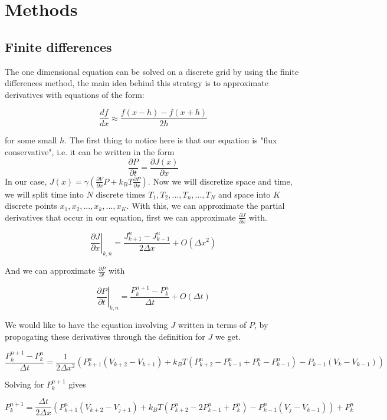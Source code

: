 \documentclass[
10pt, %
a4paper, %
oneside, %
headinclude,footinclude, %
BCOR5mm, %
]{scrartcl}
\begin{document}
\section{Methods}

\subsection{Finite differences}
The one dimensional equation can be solved on a discrete grid by using the finite differences method, the main idea behind this strategy is to approximate derivatives with equations of the form:

\begin{equation}
\frac{d f}{d x} \approx \frac{f(x - h) - f(x + h)}{2h}
\end{equation}

for some small $h$. The first thing to notice here is that our equation is "flux conservative", i.e. it can be written in the form 
$$ \frac{\partial P}{\partial t} = \frac{\partial J(x)}{\partial x} $$
In our case, $J(x) = \gamma \left ( \frac{\partial V}{\partial x} P + k_B T \frac{\partial P}{\partial x} \right ) $. Now we will discretize space and time, we will split time into $N$ discrete times  $T_1, T_2, ..., T_n, ..., T_N$ and space into $K$ discrete points $x_1, x_2, ..., x_k, ..., x_K$. With this, we can approximate the partial derivatives that occur in our equation, first we can approximate $\frac{\partial J}{\partial x}$ with.

$$ \left. \frac{\partial J}{\partial x} \right|_{k, n} = \frac{J_{k+1}^n - J_{k-1}^n}{2 \Delta x} + O(\Delta x^2) $$

And we can approximate $\frac{\partial P}{\partial t}$ with

$$ \left. \frac{\partial P}{\partial t} \right|_{k, n} = \frac{P_k^{n+1} - P_k^n}{\Delta t} + O(\Delta t) $$

We would like to have the equation involving $J$ written in terms of $P$, by propogating these derivatives through the definition for $J$ we get.

$$ \frac{P_k^{n+1} - P_k^n}{\Delta t} = \frac{1}{2 \Delta x^2} \left (P_{k+1}^n(V_{k+2} - V_{k+1}) + k_B T(P_{k+2}^n - P_{k-1}^n + P_k^n - P_{k-1}^n) - P_{k-1}(V_k - V_{k-1}) \right ) $$

Solving for $P_k^{n+1}$ gives

$$ P_k^{n+1} = \frac{\Delta t}{2 \Delta x} \left (P_{k+1}^n(V_{k+2} - V_{j+1}) + k_B T(P_{k+2}^n - 2P_{k-1}^n + P_k^n) - P_{k-1}^n(V_j - V_{k-1}) \right ) + P_k^n $$
\end{document}
